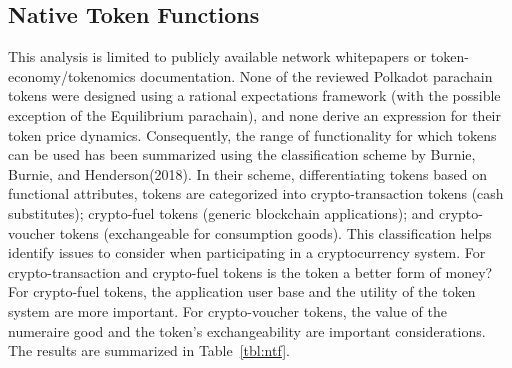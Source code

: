 \documentclass[11pt]{article}
\begin{document}
\subsection{Native Token Functions}

This analysis is limited to publicly available network whitepapers or token-economy/tokenomics documentation. None of the reviewed Polkadot parachain tokens were designed using a rational expectations framework (with the possible exception of the Equilibrium parachain), and none derive an expression for their token price dynamics. Consequently, the range of functionality for which tokens can be used has been summarized using the classification scheme by Burnie, Burnie, and Henderson(2018)\autocite{burnie18}.  In their scheme, differentiating tokens based on functional attributes, tokens are categorized into crypto-transaction tokens (cash substitutes); crypto-fuel tokens (generic blockchain applications); and crypto-voucher tokens (exchangeable for consumption goods). This classification helps identify issues to consider when participating in a cryptocurrency system.  For crypto-transaction and crypto-fuel tokens is the token a better form of money? For crypto-fuel tokens, the application user base and the utility of the token system are more important. For crypto-voucher tokens, the value of the numeraire good and the token’s exchangeability are important considerations.  The results are summarized in Table~\ref{tbl:ntf}.
\end{document}
